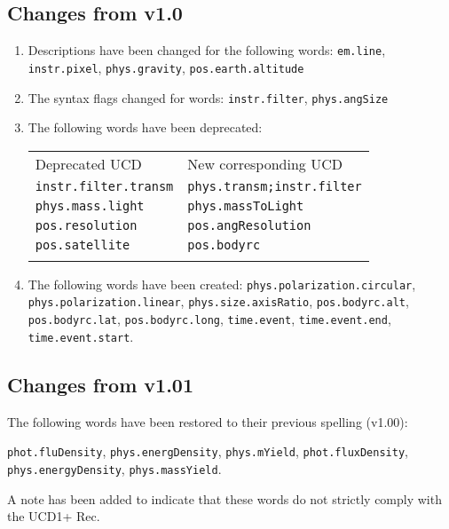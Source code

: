 \documentclass[11pt,a4paper]{ivoa}
\begin{document}
\subsection{Changes from v1.0}
\begin{enumerate}
\item Descriptions have been changed for the following words: {\tt em.line}, {\tt instr.pixel}, 
{\tt phys.gravity}, {\tt pos.earth.altitude}
\item The syntax flags changed for words: {\tt instr.filter}, {\tt phys.angSize}
\item The following words have been deprecated:

\begin{tabular}{|l|l|}
\sptablerule
Deprecated UCD & New corresponding UCD\\
\sptablerule
{\tt instr.filter.transm} & {\tt phys.transm;instr.filter}\\
{\tt phys.mass.light} & {\tt phys.massToLight}\\
{\tt pos.resolution} & {\tt pos.angResolution}\\
{\tt pos.satellite} & {\tt pos.bodyrc}\\
\sptablerule
\end{tabular}

\item \begin{flushleft}
The following words have been created: 
{\tt phys.polarization.circular}, 
{\tt phys.polarization.linear}, {\tt phys.size.axisRatio}, {\tt pos.bodyrc.alt}, 
{\tt pos.bodyrc.lat}, {\tt pos.bodyrc.long}, {\tt time.event}, {\tt time.event.end}, 
{\tt time.event.start}.
\end{flushleft}
\end{enumerate}

\subsection{Changes from v1.01}

The following words have been restored to their previous spelling (v1.00): 
\begin{flushleft}
{\tt phot.fluDensity}, 
{\tt phys.energDensity}, {\tt phys.mYield}, {\tt phot.fluxDensity}, {\tt phys.energyDensity}, 
{\tt phys.massYield}.
\end{flushleft}

A note has been added to indicate that these words do not strictly comply with the UCD1+ Rec.
\end{document}
